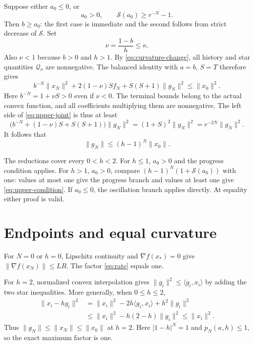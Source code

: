 \documentclass[11pt]{article}
\numberwithin{equation}{section}
\theoremstyle{remark}
\newcommand{\ip}[2]{\langle #1,#2\rangle}
\newcommand{\norm}[1]{\lVert #1\rVert}
\newcommand{\grad}{\nabla}
\newcommand{\Q}{\mathcal Q}
\begin{document}
Suppose either $a_0\leq0$, or
\begin{equation}
a_0>0,\qquad \mathcal S(a_0)\geq r^{-N}-1.
\label{eq:upper-condition}
\end{equation}
Then $b\geq a_0$: the first case is immediate and the second follows
from strict decrease of $\mathcal S$. Set
\[
\nu=\frac{1-b}{h}\leq\kappa.
\]
Also $\nu<1$ because $b>0$ and $h>1$. By
\eqref{eq:curvature-change}, all history and star quantities
$\Q_\nu$ are nonnegative. The balanced identity with $a=b$, $S=T$
therefore gives
\begin{equation}
b^{-N}\norm{x_N}^2+2(1-\nu)Sf_N
 +S(S+1)\norm{g_N}^2\leq\norm{x_0}^2.
\label{eq:upper-joint}
\end{equation}
Here $b^{-N}=1+\nu S>0$ even if $\nu<0$.
The terminal bounds belong to the actual convex function, and all
coefficients multiplying them are nonnegative. The left side of
\eqref{eq:upper-joint} is thus at least
\[
\bigl(b^{-N}+(1-\nu)S+S(S+1)\bigr)\norm{g_N}^2
=(1+S)^2\norm{g_N}^2=r^{-2N}\norm{g_N}^2.
\]
It follows that
\begin{equation}
\norm{g_N}\leq(h-1)^N\norm{x_0}.
\label{eq:upper-bound}
\end{equation}

The reductions cover every $0<h<2$. For $h\leq1$, $a_0>0$ and the
progress condition applies. For $h>1$, $a_0>0$, compare
$(h-1)^N(1+\mathcal S(a_0))$ with one: values at most one give the
progress branch and values at least one give
\eqref{eq:upper-condition}. If $a_0\leq0$, the oscillation branch
applies directly. At equality either proof is valid.

\section{Endpoints and equal curvature}

For $N=0$ or $h=0$, Lipschitz continuity and $\grad f(x_*)=0$ give
$\norm{\grad f(x_N)}\leq LR$. The factor \eqref{eq:rate} equals one.

For $h=2$, normalized convex interpolation gives
$\norm{g_i}^2\leq\ip{g_i}{x_i}$ by adding the two star inequalities.
More generally, when $0\leq h\leq2$,
\begin{align*}
\norm{x_i-hg_i}^2
&=\norm{x_i}^2-2h\ip{g_i}{x_i}+h^2\norm{g_i}^2\\
&\leq\norm{x_i}^2-h(2-h)\norm{g_i}^2
\leq\norm{x_i}^2.
\end{align*}
Thus $\norm{g_N}\leq\norm{x_N}\leq\norm{x_0}$ at $h=2$.
Here $|1-h|^N=1$ and $p_N(\kappa,h)\leq1$, so the exact maximum
factor is one.
\end{document}
